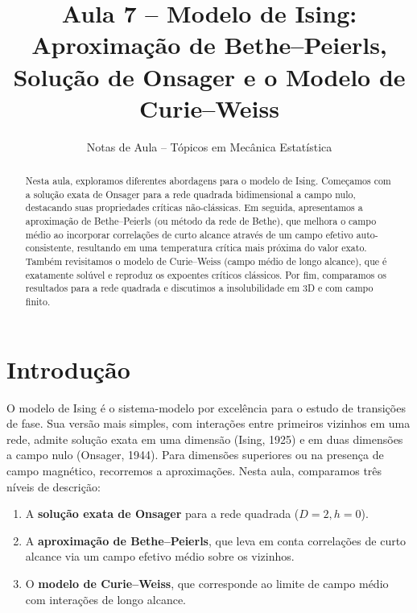 \documentclass[12pt]{article}
\begin{document}
\title{Aula 7 -- Modelo de Ising: \\ 
       Aproximação de Bethe–Peierls, Solução de Onsager e o Modelo de Curie–Weiss}
\author{Notas de Aula -- Tópicos em Mecânica Estatística}
\date{}

\maketitle

\begin{abstract}
Nesta aula, exploramos diferentes abordagens para o modelo de Ising. Começamos com a solução exata de Onsager para a rede quadrada bidimensional a campo nulo, destacando suas propriedades críticas não-clássicas. Em seguida, apresentamos a aproximação de Bethe–Peierls (ou método da rede de Bethe), que melhora o campo médio ao incorporar correlações de curto alcance através de um campo efetivo auto-consistente, resultando em uma temperatura crítica mais próxima do valor exato. Também revisitamos o modelo de Curie–Weiss (campo médio de longo alcance), que é exatamente solúvel e reproduz os expoentes críticos clássicos. Por fim, comparamos os resultados para a rede quadrada e discutimos a insolubilidade em 3D e com campo finito.
\end{abstract}

\section{Introdução}

O modelo de Ising é o sistema-modelo por excelência para o estudo de transições de fase. Sua versão mais simples, com interações entre primeiros vizinhos em uma rede, admite solução exata em uma dimensão (Ising, 1925) e em duas dimensões a campo nulo (Onsager, 1944). Para dimensões superiores ou na presença de campo magnético, recorremos a aproximações. Nesta aula, comparamos três níveis de descrição:

\begin{enumerate}
    \item A \textbf{solução exata de Onsager} para a rede quadrada (\(D=2, h=0\)).
    \item A \textbf{aproximação de Bethe–Peierls}, que leva em conta correlações de curto alcance via um campo efetivo médio sobre os vizinhos.
    \item O \textbf{modelo de Curie–Weiss}, que corresponde ao limite de campo médio com interações de longo alcance.
\end{enumerate}
\end{document}
